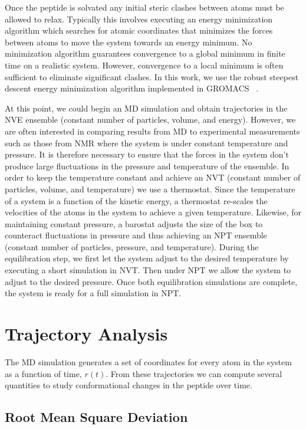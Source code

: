 Once the peptide is solvated any initial steric clashes between atoms must be allowed to relax. Typically this involves executing an energy minimization algorithm which searches for atomic coordinates that minimizes the forces between atoms to move the system towards an energy minimum. No minimization algorithm guarantees convergence to a global minimum in finite time on a realistic system. However, convergence to a local minimum is often sufficient to eliminate significant clashes. In this work, we use the robust steepest descent energy minimization algorithm implemented in GROMACS ~\cite{hess2008gromacs}. 

At this point, we could begin an MD simulation and obtain trajectories in the NVE ensemble (constant number of particles, volume, and energy). However, we are often interested in comparing results from MD to experimental measurements such as those from NMR where the system is under constant temperature and pressure. It is therefore necessary to ensure that the forces in the system don't produce large fluctuations in the pressure and temperature of the ensemble. In order to keep the temperature constant and achieve an NVT (constant number of particles, volume, and temperature) we use a thermostat. Since the temperature of a system is a function of the kinetic energy, a thermostat re-scales the velocities of the atoms in the system to achieve a given temperature. Likewise, for maintaining constant pressure, a barostat adjusts the size of the box to counteract fluctuations in pressure and thus achieving an NPT ensemble (constant number of particles, pressure, and temperature). During the equilibration step, we first let the system adjust to the desired temperature by executing a short simulation in NVT. Then under NPT we allow the system to adjust to the desired pressure. Once both equilibration simulations are complete, the system is ready for a full simulation in NPT. 

\section{Trajectory Analysis}

The MD simulation generates a set of coordinates for every atom in the system as a function of time, $r(t)$. From these trajectories we can compute several quantities to study conformational changes in the peptide over time. 

\subsection{Root Mean Square Deviation}

